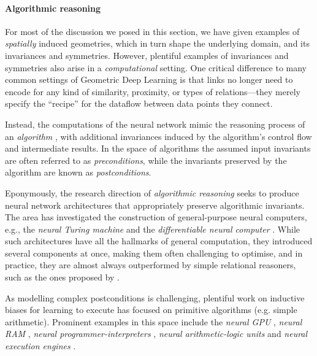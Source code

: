 

\paragraph{Algorithmic reasoning} 
For most of the discussion we posed in this section, we have given examples of \emph{spatially} induced geometries, which in turn shape the underlying domain, and its invariances and symmetries. However, plentiful examples of invariances and symmetries also arise in a \emph{computational} setting. One critical difference to many common settings of Geometric Deep Learning is that links no longer need to encode for any kind of similarity, proximity, or types of relations---they merely specify the ``recipe'' for the dataflow between data points they connect.

Instead, the computations of the neural network mimic the reasoning process of an \emph{algorithm} \citep{cormen2009introduction}, with additional invariances induced by the algorithm's control flow and intermediate results. In the space of algorithms the assumed input invariants are often referred to as \emph{preconditions}, while the invariants preserved by the algorithm are known as \emph{postconditions}.

Eponymously, the research direction of \emph{algorithmic reasoning} \citep[Section 3.3.]{cappart2021combinatorial} seeks to produce neural network architectures that appropriately preserve algorithmic invariants. The area has investigated the construction of general-purpose neural computers, e.g., the \emph{neural Turing machine} \citep{graves2014neural} and the \emph{differentiable neural computer} \citep{graves2016hybrid}. While such architectures have all the hallmarks of general computation, they introduced several components at once, making them often challenging to optimise, and in practice, they are almost always outperformed by simple relational reasoners, such as the ones proposed by \citet{santoro2017simple,santoro2018relational}. 

As modelling complex postconditions is challenging, plentiful work on inductive biases for learning to execute \citep{zaremba2014learning} has focused on primitive algorithms (e.g. simple arithmetic). Prominent examples in this space include the \emph{neural GPU} \citep{kaiser2015neural}, \emph{neural RAM} \citep{kurach2015neural}, \emph{neural programmer-interpreters} \citep{reed2015neural}, \emph{neural arithmetic-logic units} \citep{trask2018neural,madsen2020neural} and \emph{neural execution engines} \citep{yan2020neural}.

